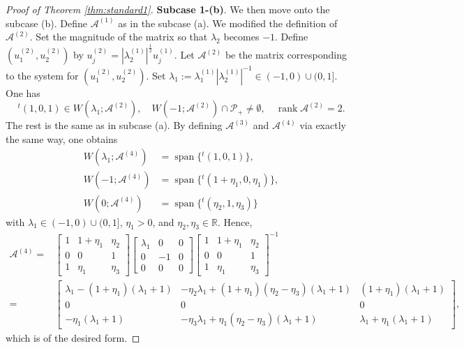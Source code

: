 \documentclass[11pt,a4paper,twosides]{amsart}
\theoremstyle{plain}
\theoremstyle{remark}
\numberwithin{equation}{section}
\newcommand{\R}{\mathbb{R}}
\DeclareMathOperator{\rank}{rank}
\DeclareMathOperator{\Span}{span}
\theoremstyle{definition}
\newcommand{\1}{{\bf 1}_{\{|x| < |t|\}}}
\begin{document}
\begin{proof}[Proof of Theorem \ref{thm:standard1}]
{\bf Subcase 1-(b)}.
We then move onto the subcase (b).
Define $\mathscr{A}^{(1)}$ as in the subcase (a).
We modified the definition of $\mathscr{A}^{(2)}$. Set the magnitude of the matrix so that $\lambda_2$ becomes $-1$.
Define $(u_1^{(2)},u_2^{(2)})$ by
$u_j^{(2)}=|\lambda_2^{(1)}|^{\frac12}u_j^{(1)}$.
Let $\mathscr{A}^{(2)}$ be the matrix corresponding to the system for $(u_1^{(2)},u_2^{(2)})$. 
Set $\lambda_1:= \lambda_1^{(1)}|\lambda_2^{(1)}|^{-1} \in (-1,0)\cup(0,1]$.
One has
\[
	{}^t\!(1,0,1) \in W(\lambda_1;\mathscr{A}^{(2)}), \quad
	W(-1;\mathscr{A}^{(2)}) \cap \mathcal{P}_+ \neq \emptyset, \quad
	\rank \mathscr{A}^{(2)}=2.
\]
The rest is the same as in subcase (a).
By defining $\mathscr{A}^{(3)}$ and $\mathscr{A}^{(4)}$ via exactly the same way,
one obtains
\begin{align*}
	W(\lambda_1;\mathscr{A}^{(4)}) 
	&= \Span \{{}^t\!(1,0,1) \}, \\
	W(-1;\mathscr{A}^{(4)}) 
	&= \Span \{{}^t\!(1+\eta_1,0,\eta_1) \}, \\
	W(0;\mathscr{A}^{(4)}) 
	&= \Span \{{}^t\!(\eta_2,1,\eta_3) \}
\end{align*}
with $\lambda_1\in (-1,0)\cup(0,1]$,
$\eta_1>0$, and $\eta_2,\eta_3\in \R$.
Hence,
\begin{align*}
	\mathscr{A}^{(4)}
	={}& \begin{bmatrix}
	1 & 1+\eta_1 & \eta_2 \\
	0 & 0& 1\\
	1 & \eta_1& \eta_3
	\end{bmatrix}
	\begin{bmatrix}
	\lambda_1 & 0 & 0 \\
	0 & -1 & 0\\
	0 & 0 & 0
	\end{bmatrix}
	\begin{bmatrix}
	1 & 1+\eta_1 & \eta_2 \\
	0 & 0& 1\\
	1 & \eta_1& \eta_3
	\end{bmatrix}^{-1} \\
	={}& \begin{bmatrix}
	\lambda_1 - (1+\eta_1)(\lambda_1+1) & 
	-\eta_2\lambda_1 +(1+\eta_1)(\eta_2-\eta_3)(\lambda_1+1) 
	& (1+\eta_1)(\lambda_1+1) \\
	0 & 0 & 0\\
	-\eta_1(\lambda_1+1) & -\eta_3 \lambda_1 +\eta_1(\eta_2-\eta_3)(\lambda_1+1)& \lambda_1 +\eta_1(\lambda_ 1+1)
	\end{bmatrix},
\end{align*}
which is of the desired form.


\end{proof}
\end{document}
